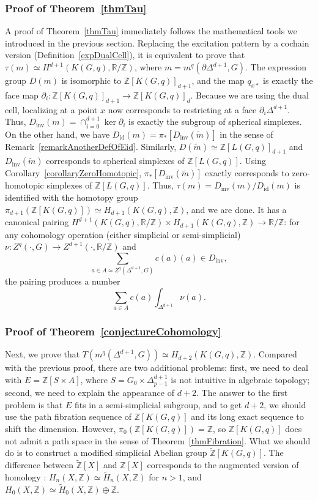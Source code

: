 \documentclass[reprint, amsmath, amssymb, showpacs, floatfix, longbibliography, aps, twocolumn, superscriptaddress, nofootinbib]{revtex4-2}
\newcommand{\ZZ}{{\mathbb Z}}
\newcommand{\RR}{{\mathbb R}}
\newcommand{\tZ}{{\widetilde{\mathbb Z}}}
\newcommand{\id}{{\operatorname{id}}}
\newcommand{\inv}{{\operatorname{inv}}}
\theoremstyle{definition}
\begin{document}
\subsubsection*{Proof of Theorem~\ref{thmTau}}
A proof of Theorem~\ref{thmTau} immediately follows the mathematical tools we introduced in the previous section. Replacing the excitation pattern by a cochain version (Definition~\ref{expDualCell}), it is equivalent to prove that $\tau(m)\simeq H^{d+1}(K(G,q),\RR/\ZZ)$, where $m=m^q(\partial\Delta^{d+1},G)$. The expression group $D(m)$ is isomorphic to $\ZZ[K(G,q)]_{d+1}$, and the map  $q_{x*}$ is exactly the face map $\partial_i: \ZZ[K(G,q)]_{d+1}\rightarrow \ZZ[K(G,q)]_{d}$. Because we are using the dual cell, localizing at a point $x$ now corresponds to restricting at a face $\partial_i\Delta^{d+1}$. Thus, $D_\inv(m)=\cap_{i=0}^{d+1}\ker \partial_i$ is exactly the subgroup of spherical simplexes. On the other hand, we have $D_\id(m)=\pi_*[D_\inv(\tilde{m})]$ in the sense of Remark~\ref{remarkAnotherDefOfEid}. Similarly, $D(\tilde{m})\simeq \ZZ[L(G,q)]_{d+1}$ and $D_\inv (\tilde{m})$ corresponds to spherical simplexes of $\ZZ[L(G,q)]$. Using Corollary~\ref{corollaryZeroHomotopic}, $\pi_*[D_\inv(\tilde{m})]$ exactly corresponds to zero-homotopic simplexes of $\ZZ[L(G,q)]$. Thus, $\tau(m)=D_\inv(m)/D_\id(m)$ is identified with the homotopy group $\pi_{d+1}(\ZZ[K(G,q)])\simeq H_{d+1}(K(G,q),\ZZ)$, and we are done. It has a canonical pairing $H^{d+1}(K(G,q),\RR/\ZZ)\times H_{d+1}(K(G,q),\ZZ)\rightarrow \RR/\ZZ$: for any cohomology operation (either simplicial or semi-simplicial) $\nu:Z^q(\cdot,G)\rightarrow Z^{d+1}(\cdot,\RR/\ZZ)$ and 
\begin{equation}
	\sum_{a\in A\simeq Z^q(\Delta^{d+1},G)}c(a)(a)\in D_\inv,
\end{equation}
the pairing produces a number
\begin{equation}
	\sum_{a\in A} c(a)\int_{\Delta^{d+1}} \nu(a).
\end{equation}

\subsubsection*{Proof of Theorem~\ref{conjectureCohomology}}

Next, we prove that $T(m^q(\Delta^{d+1},G))\simeq H_{d+2}(K(G,q),\ZZ)$. Compared with the previous proof, there are two additional problems: first, we need to deal with $E=\ZZ[S\times A]$, where $S=G_0\times \Delta^{d+1}_{p-1}$ is not intuitive in algebraic topology; second, we need to explain the appearance of $d+2$. The answer to the first problem is that $E$ fits in a semi-simplicial subgroup, and to get $d+2$, we should use the path fibration sequence of $\ZZ[K(G,q)]$ and its long exact sequence to shift the dimension. However, $\pi_0(\ZZ[K(G,q)])=\ZZ$, so $\ZZ[K(G,q)]$ does not admit a path space in the sense of Theorem~\ref{thmFibration}. What we should do is to construct a modified simplicial Abelian group $\tZ[K(G,q)]$. The difference between $\tZ[X]$ and $\ZZ[X]$ corresponds to the augmented version of homology : $H_n(X,\ZZ)\simeq \widetilde{H}_n(X,\ZZ)$ for $n>1$, and $H_0(X,\ZZ)\simeq \widetilde{H}_0(X,\ZZ)\oplus\ZZ$. 
\end{document}
